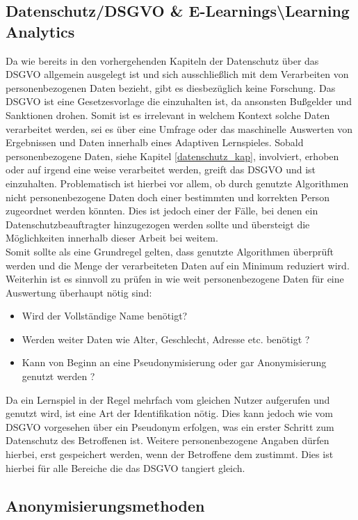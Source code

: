 \documentclass[a4paper, 12pt]{article}
\begin{document}
\subsection{Datenschutz/DSGVO \& E-Learnings\textbackslash Learning Analytics}
Da wie bereits in den vorhergehenden Kapiteln der Datenschutz über das DSGVO allgemein ausgelegt ist und sich ausschließlich mit dem Verarbeiten von personenbezogenen Daten bezieht, gibt es diesbezüglich keine Forschung. Das DSGVO ist eine Gesetzesvorlage die einzuhalten ist, da ansonsten Bußgelder und Sanktionen drohen. Somit ist es irrelevant in welchem Kontext solche Daten verarbeitet werden, sei es über eine Umfrage oder das maschinelle Auswerten von Ergebnissen und Daten innerhalb eines Adaptiven Lernspieles. Sobald personenbezogene Daten, siehe Kapitel \ref{datenschutz_kap}, involviert, erhoben oder auf irgend eine weise verarbeitet werden, greift das DSGVO und ist einzuhalten. Problematisch ist hierbei vor allem, ob durch genutzte Algorithmen nicht personenbezogene Daten doch einer bestimmten und korrekten Person zugeordnet werden könnten. Dies ist jedoch einer der Fälle, bei denen ein Datenschutzbeauftragter hinzugezogen werden sollte und übersteigt die Möglichkeiten innerhalb dieser Arbeit bei weitem.\\ Somit sollte als eine Grundregel gelten, dass genutzte Algorithmen überprüft werden und die Menge der verarbeiteten Daten auf ein Minimum reduziert wird.\\Weiterhin ist es sinnvoll zu prüfen in wie weit personenbezogene Daten für eine Auswertung überhaupt nötig sind:
\begin{itemize}
	\item Wird der Vollständige Name benötigt?
	\item Werden weiter Daten wie Alter, Geschlecht, Adresse etc. benötigt ?
	\item Kann von Beginn an eine Pseudonymisierung oder gar Anonymisierung genutzt werden ?
\end{itemize}
Da ein Lernspiel in der Regel mehrfach vom gleichen Nutzer aufgerufen und genutzt wird, ist eine Art der Identifikation nötig. Dies kann jedoch wie vom DSGVO vorgesehen über ein Pseudonym erfolgen, was ein erster Schritt zum Datenschutz des Betroffenen ist. Weitere personenbezogene Angaben dürfen hierbei, erst gespeichert werden, wenn der Betroffene dem zustimmt. Dies ist hierbei für alle Bereiche die das DSGVO tangiert gleich.

\newpage
\subsection{Anonymisierungsmethoden}
\end{document}
